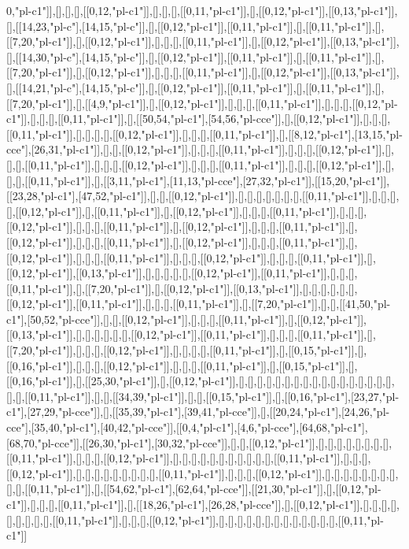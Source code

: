 0,"pl-c1"]],[],[],[],[[0,12,"pl-c1"]],[],[],[],[[0,11,"pl-c1"]],[],[[0,12,"pl-c1"]],[[0,13,"pl-c1"]],[],[[14,23,"pl-c"],[14,15,"pl-c"]],[],[[0,12,"pl-c1"]],[[0,11,"pl-c1"]],[],[[0,11,"pl-c1"]],[],[[7,20,"pl-c1"]],[],[[0,12,"pl-c1"]],[],[],[],[[0,11,"pl-c1"]],[],[[0,12,"pl-c1"]],[[0,13,"pl-c1"]],[],[[14,30,"pl-c"],[14,15,"pl-c"]],[],[[0,12,"pl-c1"]],[[0,11,"pl-c1"]],[],[[0,11,"pl-c1"]],[],[[7,20,"pl-c1"]],[],[[0,12,"pl-c1"]],[],[],[],[[0,11,"pl-c1"]],[],[[0,12,"pl-c1"]],[[0,13,"pl-c1"]],[],[[14,21,"pl-c"],[14,15,"pl-c"]],[],[[0,12,"pl-c1"]],[[0,11,"pl-c1"]],[],[[0,11,"pl-c1"]],[],[[7,20,"pl-c1"]],[],[[4,9,"pl-c1"]],[],[[0,12,"pl-c1"]],[],[],[],[[0,11,"pl-c1"]],[],[],[],[[0,12,"pl-c1"]],[],[],[],[[0,11,"pl-c1"]],[],[[50,54,"pl-c1"],[54,56,"pl-cce"]],[],[[0,12,"pl-c1"]],[],[],[],[[0,11,"pl-c1"]],[],[],[],[],[[0,12,"pl-c1"]],[],[],[],[[0,11,"pl-c1"]],[],[[8,12,"pl-c1"],[13,15,"pl-cce"],[26,31,"pl-c1"]],[],[],[[0,12,"pl-c1"]],[],[],[],[[0,11,"pl-c1"]],[],[],[],[[0,12,"pl-c1"]],[],[],[],[[0,11,"pl-c1"]],[],[],[],[[0,12,"pl-c1"]],[],[],[],[[0,11,"pl-c1"]],[],[],[],[[0,12,"pl-c1"]],[],[],[],[[0,11,"pl-c1"]],[],[[3,11,"pl-c1"],[11,13,"pl-cce"],[27,32,"pl-c1"]],[[15,20,"pl-c1"]],[[23,28,"pl-c1"],[47,52,"pl-c1"]],[],[],[[0,12,"pl-c1"]],[],[],[],[],[],[],[],[[0,11,"pl-c1"]],[],[],[],[],[[0,12,"pl-c1"]],[],[[0,11,"pl-c1"]],[],[[0,12,"pl-c1"]],[],[],[],[[0,11,"pl-c1"]],[],[],[],[[0,12,"pl-c1"]],[],[],[],[[0,11,"pl-c1"]],[],[[0,12,"pl-c1"]],[],[],[],[[0,11,"pl-c1"]],[],[[0,12,"pl-c1"]],[],[],[],[[0,11,"pl-c1"]],[],[[0,12,"pl-c1"]],[],[],[],[[0,11,"pl-c1"]],[],[[0,12,"pl-c1"]],[],[],[],[[0,11,"pl-c1"]],[],[],[],[[0,12,"pl-c1"]],[],[],[],[[0,11,"pl-c1"]],[],[[0,12,"pl-c1"]],[[0,13,"pl-c1"]],[],[],[],[],[],[[0,12,"pl-c1"]],[[0,11,"pl-c1"]],[],[],[],[[0,11,"pl-c1"]],[],[[7,20,"pl-c1"]],[],[[0,12,"pl-c1"]],[[0,13,"pl-c1"]],[],[],[],[],[],[],[[0,12,"pl-c1"]],[[0,11,"pl-c1"]],[],[],[],[[0,11,"pl-c1"]],[],[[7,20,"pl-c1"]],[],[],[[41,50,"pl-c1"],[50,52,"pl-cce"]],[],[],[[0,12,"pl-c1"]],[],[],[],[[0,11,"pl-c1"]],[],[[0,12,"pl-c1"]],[[0,13,"pl-c1"]],[],[],[],[],[],[],[[0,12,"pl-c1"]],[[0,11,"pl-c1"]],[],[],[],[[0,11,"pl-c1"]],[],[[7,20,"pl-c1"]],[],[],[],[[0,12,"pl-c1"]],[],[],[],[],[[0,11,"pl-c1"]],[],[[0,15,"pl-c1"]],[],[[0,16,"pl-c1"]],[],[],[],[[0,12,"pl-c1"]],[],[],[],[[0,11,"pl-c1"]],[],[[0,15,"pl-c1"]],[],[[0,16,"pl-c1"]],[],[[25,30,"pl-c1"]],[],[[0,12,"pl-c1"]],[],[],[],[],[],[],[],[],[],[],[],[],[],[],[],[],[],[],[],[[0,11,"pl-c1"]],[],[],[[34,39,"pl-c1"]],[],[],[[0,15,"pl-c1"]],[],[[0,16,"pl-c1"],[23,27,"pl-c1"],[27,29,"pl-cce"]],[],[[35,39,"pl-c1"],[39,41,"pl-cce"]],[],[[20,24,"pl-c1"],[24,26,"pl-cce"],[35,40,"pl-c1"],[40,42,"pl-cce"]],[[0,4,"pl-c1"],[4,6,"pl-cce"],[64,68,"pl-c1"],[68,70,"pl-cce"]],[[26,30,"pl-c1"],[30,32,"pl-cce"]],[],[],[[0,12,"pl-c1"]],[],[],[],[],[],[],[],[],[[0,11,"pl-c1"]],[],[],[],[[0,12,"pl-c1"]],[],[],[],[],[],[],[],[],[],[],[],[[0,11,"pl-c1"]],[],[],[],[[0,12,"pl-c1"]],[],[],[],[],[],[],[],[],[],[[0,11,"pl-c1"]],[],[],[],[[0,12,"pl-c1"]],[],[],[],[],[],[],[],[],[],[],[[0,11,"pl-c1"]],[],[[54,62,"pl-c1"],[62,64,"pl-cce"]],[[21,30,"pl-c1"]],[],[[0,12,"pl-c1"]],[],[],[],[[0,11,"pl-c1"]],[],[[18,26,"pl-c1"],[26,28,"pl-cce"]],[],[[0,12,"pl-c1"]],[],[],[],[],[],[],[],[],[],[[0,11,"pl-c1"]],[],[],[],[[0,12,"pl-c1"]],[],[],[],[],[],[],[],[],[],[],[],[],[],[[0,11,"pl-c1"]]